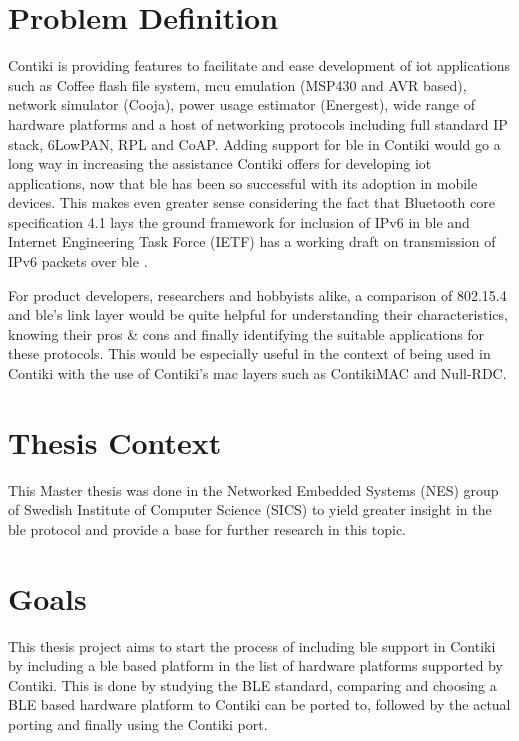 \section{Problem Definition}

Contiki is providing features to facilitate and ease development of \gls{iot} applications such as Coffee flash file system, \gls{mcu} emulation (MSP430 and AVR based), network simulator (Cooja), power usage estimator (Energest), wide range of hardware platforms and a host of networking protocols including full standard IP stack, 6LowPAN, RPL and CoAP. Adding support for \gls{ble} in Contiki would go a long way in increasing the assistance Contiki offers for developing \gls{iot} applications, now that \gls{ble} has been so successful with its adoption in mobile devices. This makes even greater sense considering the fact that Bluetooth core specification 4.1 lays the ground framework for inclusion of IPv6 in \gls{ble} \cite{4.0to4.1} and Internet Engineering Task Force (IETF)  has a working draft on transmission of IPv6 packets over \gls{ble} \cite{ieftIPv6Draft}.

For product developers, researchers and hobbyists alike, a comparison of 802.15.4 and \gls{ble}'s link layer would be quite helpful for understanding their characteristics, knowing their pros \& cons and finally identifying the suitable applications for these protocols. This would be especially useful in the context of being used in Contiki with the use of Contiki's \gls{mac} layers such as ContikiMAC and Null-RDC. 


\section{Thesis Context}

This Master thesis was done in the Networked Embedded Systems (NES) group of Swedish Institute of Computer Science (SICS) to yield greater insight in the \gls{ble} protocol and provide a base for further research in this topic.

\section{Goals}

This thesis project aims to start the process of including \gls{ble} support in Contiki by including a \gls{ble} based platform in the list of hardware platforms supported by Contiki. This is done by studying the BLE standard, comparing and choosing a BLE based hardware platform to Contiki can be ported to, followed by the actual porting and finally using the Contiki port. 

